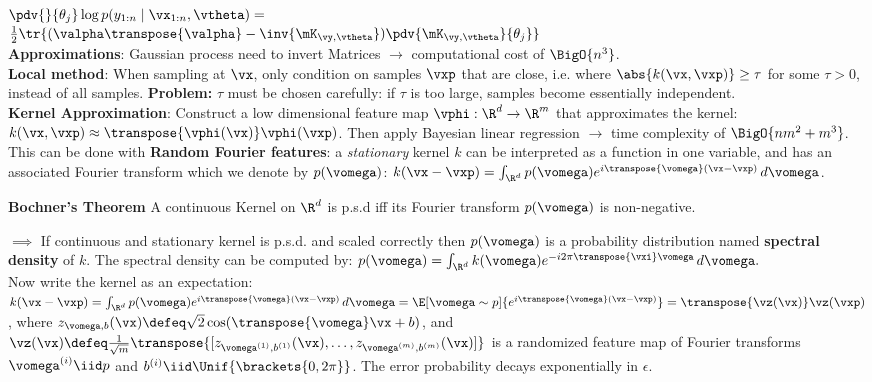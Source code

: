 $\pdv{}{\theta_j} \log p(y_{1:n} \mid \vx_{1:n}, \vtheta) = $ \\
$\frac{1}{2} \tr{(\valpha \transpose{\valpha} - \inv{\mK_{\vy,\vtheta}}) \pdv{\mK_{\vy,\vtheta}}{\theta_j}}$ \\
\textbf{Approximations}: Gaussian process need to invert Matrices $\rightarrow$ computational cost of $\BigO{n^3}$. \\ 
\textbf{Local method}: When sampling at $\vx$, only condition on samples $\vxp$ that are close, i.e. where $\abs{k(\vx, \vxp)} \geq \tau$ for some $\tau > 0$, instead of all samples. \textbf{Problem:} $\tau$ must be chosen carefully: if $\tau$ is too large, samples become essentially independent. \\
\textbf{Kernel Approximation}: Construct a low dimensional feature map $\vphi : \R^d \to \R^m$ that approximates the kernel: $k(\vx, \vxp) \approx \transpose{\vphi(\vx)} \vphi(\vxp)$. Then apply Bayesian linear regression $\rightarrow$ time complexity of $\BigO{n m^2 + m^3}$. This can be done with \textbf{Random Fourier features}: a \textit{stationary} kernel $k$ can be interpreted as a function in one variable, and has an associated Fourier transform which we denote by $p(\vomega)$: $k(\vx-\vxp) = \int_{\R^d} p(\vomega) e^{i \transpose{\vomega} (\vx-\vxp)} \,d\vomega$.
\begin{framed}
    \textbf{Bochner's Theorem} A continuous Kernel on $\R^d$ is p.s.d iff its Fourier transform $p(\vomega)$ is non-negative.
\end{framed}
$\implies$ If continuous and stationary kernel is p.s.d. and scaled correctly then $p(\vomega)$ is a probability distribution named \textbf{spectral density} of $k$. The spectral density can be computed by: $p(\vomega) = \int_{\R^d} k(\vomega) e^{- i 2 \pi \transpose{\vxi} \vomega} \,d\vomega.$ \\ Now write the kernel as an expectation: $k(\vx-\vxp) = \int_{\R^d} p(\vomega) e^{i \transpose{\vomega} (\vx-\vxp)} \,d\vomega = \E[\vomega \sim p]{e^{i \transpose{\vomega}(\vx-\vxp)}}= \transpose{\vz(\vx)} \vz(\vxp)$, where $z_{\vomega,b}(\vx) \defeq \sqrt{2} \cos(\transpose{\vomega} \vx + b)$, and $\vz(\vx) \defeq \frac{1}{\sqrt{m}} \transpose{[z_{\vomega^{(1)},b^{(1)}}(\vx), \dots, z_{\vomega^{(m)},b^{(m)}}(\vx)]}$ is a randomized feature map of Fourier transforms $\vomega^{(i)} \iid p$ and $b^{(i)} \iid \Unif{\brackets{0, 2 \pi}}$. The error probability decays exponentially in $\epsilon$.
